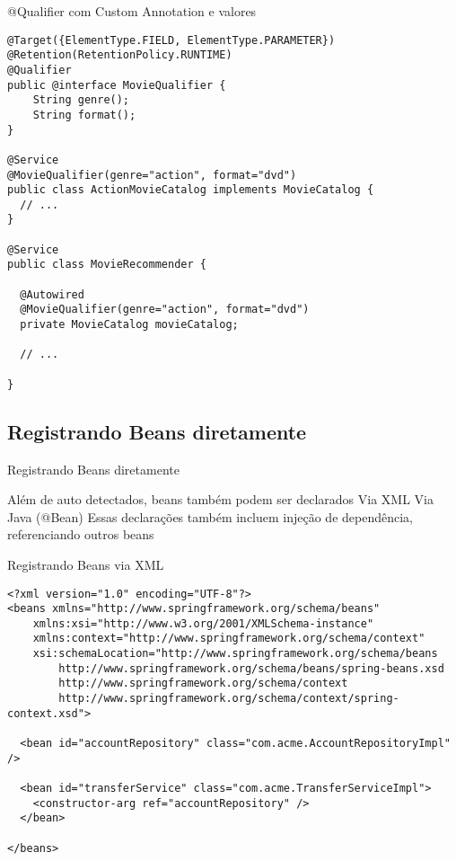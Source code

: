 \documentclass{beamer}
\begin{document}
\begin{frame}[fragile]{@Qualifier com Custom Annotation e valores}
 \begin{verbatim}
@Target({ElementType.FIELD, ElementType.PARAMETER})
@Retention(RetentionPolicy.RUNTIME)
@Qualifier
public @interface MovieQualifier {
    String genre();
    String format();
}

@Service
@MovieQualifier(genre="action", format="dvd")
public class ActionMovieCatalog implements MovieCatalog {
  // ...
}

@Service
public class MovieRecommender {

  @Autowired
  @MovieQualifier(genre="action", format="dvd")
  private MovieCatalog movieCatalog;

  // ...
  
}
  \end{verbatim}
\end{frame}

\subsection{Registrando Beans diretamente}

\begin{frame}{Registrando Beans diretamente}
 \begin{outline}
   Além de auto detectados, beans também podem ser declarados
    \2 Via XML
    \2 Via Java (@Bean)
   Essas declarações também incluem injeção de dependência, referenciando outros beans
 \end{outline}
\end{frame}

\begin{frame}[fragile]{Registrando Beans via XML}
 \begin{verbatim}
<?xml version="1.0" encoding="UTF-8"?>
<beans xmlns="http://www.springframework.org/schema/beans"
    xmlns:xsi="http://www.w3.org/2001/XMLSchema-instance"
    xmlns:context="http://www.springframework.org/schema/context"
    xsi:schemaLocation="http://www.springframework.org/schema/beans
        http://www.springframework.org/schema/beans/spring-beans.xsd
        http://www.springframework.org/schema/context
        http://www.springframework.org/schema/context/spring-context.xsd">

  <bean id="accountRepository" class="com.acme.AccountRepositoryImpl" />
        
  <bean id="transferService" class="com.acme.TransferServiceImpl">
    <constructor-arg ref="accountRepository" />
  </bean>

</beans>
  \end{verbatim}
\end{frame}
\end{document}
